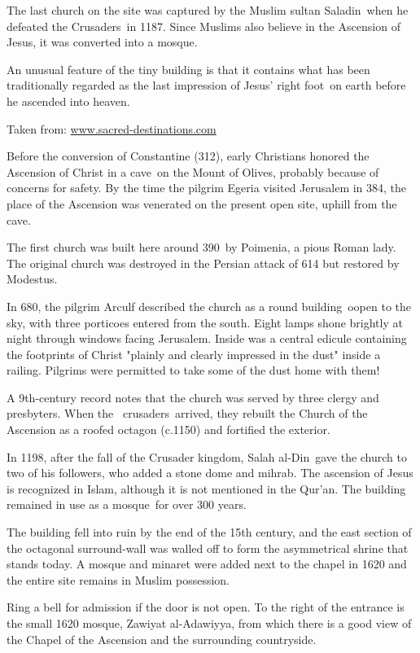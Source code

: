 \documentclass[letterpaper]{report}
\begin{document}
\begin{multicols}{2}
The last church on the site was captured by the Muslim sultan Saladin when he defeated the Crusaders in 1187. Since Muslims also believe in the Ascension of Jesus, it was converted into a mosque.

An unusual feature of the tiny building is that it contains what has been traditionally regarded as the last impression of Jesus’ right foot on earth before he ascended into heaven.

Taken from:
\href{http://www.sacred-destinations.com/israel/jerusalem-chapel-of-ascension}{
www.sacred-destinations.com}

Before the conversion of Constantine (312), early Christians honored the Ascension of Christ in a cave on the Mount of Olives, probably because of concerns for safety. By the time the pilgrim Egeria visited Jerusalem in 384, the place of the Ascension was venerated on the present open site, uphill from the cave.

The first church was built here around 390 by Poimenia, a pious Roman lady. The original church was destroyed in the Persian attack of 614 but restored by Modestus.

In 680, the pilgrim Arculf described the church as a round building oopen to the sky, with three porticoes entered from the south. Eight lamps shone brightly at night through windows facing Jerusalem. Inside was a central edicule containing the footprints of Christ "plainly and clearly impressed in the dust" inside a railing. Pilgrims were permitted to take some of the dust home with them!

A 9th-century record notes that the church was served by three clergy and presbyters. When the  crusaders arrived, they rebuilt the Church of the Ascension as a roofed octagon (c.1150) and fortified the exterior.

In 1198, after the fall of the Crusader kingdom, Salah al-Din gave the church to two of his followers, who added a stone dome and mihrab. The ascension of Jesus is recognized in Islam, although it is not mentioned in the Qur'an. The building remained in use as a mosque for over 300 years.

The building fell into ruin by the end of the 15th century, and the east section of the octagonal surround-wall was walled off to form the asymmetrical shrine that stands today. A mosque and minaret were added next to the chapel in 1620 and the entire site remains in Muslim possession.

Ring a bell for admission if the door is not open. To the right of the entrance is the small 1620 mosque, Zawiyat al-Adawiyya, from which there is a good view of the Chapel of the Ascension and the surrounding countryside.


\end{multicols}
\end{document}
